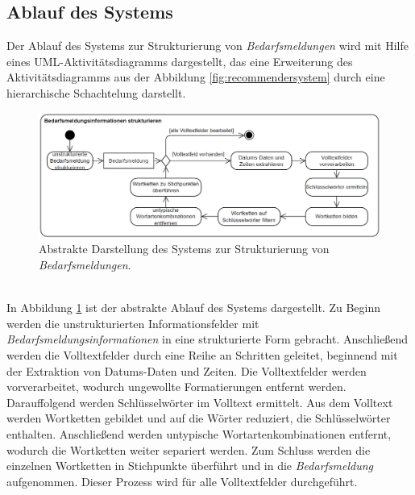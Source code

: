 \subsection{Ablauf des Systems}
Der Ablauf des Systems zur Strukturierung von \emph{Bedarfsmeldungen} wird mit Hilfe eines UML-Aktivitätsdiagramms dargestellt, das eine Erweiterung des Aktivitätsdiagramms aus der Abbildung \ref{fig:recommendersystem} durch eine hierarchische Schachtelung darstellt.
\begin{figure}[H]
	\centering  
	\includegraphics[width=\linewidth]{Abbildungen/bedarfsmeldungstrukturieren.png}
	\caption{Abstrakte Darstellung des Systems zur Strukturierung von \emph{Bedarfsmeldungen}.}
	\label{fig:ablaufsystemabstrakt}
\end{figure}\mbox{} \\
In Abbildung \ref{fig:ablaufsystemabstrakt} ist der abstrakte Ablauf des Systems dargestellt. Zu Beginn werden die unstrukturierten Informationsfelder mit \emph{Bedarfsmeldungsinformationen} in eine strukturierte Form gebracht. Anschließend werden die Volltextfelder durch eine Reihe an Schritten geleitet, beginnend mit der Extraktion von Datums-Daten und Zeiten. Die Volltextfelder werden vorverarbeitet, wodurch ungewollte Formatierungen entfernt werden. Darauffolgend werden Schlüsselwörter im Volltext ermittelt. Aus dem Volltext werden Wortketten gebildet und auf die Wörter reduziert, die Schlüsselwörter enthalten. Anschließend werden untypische Wortartenkombinationen entfernt, wodurch die Wortketten weiter separiert werden. Zum Schluss werden die einzelnen Wortketten in Stichpunkte überführt und in die \emph{Bedarfsmeldung} aufgenommen. Dieser Prozess wird für alle Volltextfelder durchgeführt.